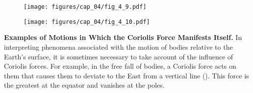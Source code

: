 \begin{figure}[t]
	\begin{minipage}[t]{0.5\linewidth}
		\begin{center}
			\texttt{[image: figures/cap\_04/fig\_4\_9.pdf]}
			\caption[]{}
			\label{fig:4_9}
		\end{center}
	\end{minipage}
	\hspace{-0.05cm}
	\begin{minipage}[t]{0.5\linewidth}
		\begin{center}
			\texttt{[image: figures/cap\_04/fig\_4\_10.pdf]}
			\caption[]{}
			\label{fig:4_10}
		\end{center}
	\end{minipage}
\end{figure}

\textbf{Examples of Motions in Which the Coriolis Force Manifests Itself.} In interpreting phenomena associated with the motion of bodies relative to the Earth's surface, it is sometimes necessary to take account of the influence of Coriolis forces. For example, in the free fall of bodies, a Coriolis force acts on them that causes them to deviate to the East from a vertical line (). This force is the greatest at the equator and vanishes at the poles.


